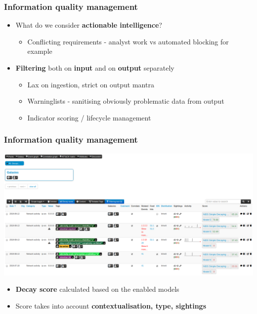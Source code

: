 \begin{frame}
\frametitle{Information quality management}
    \begin{itemize}
        \item What do we consider {\bf actionable intelligence}?
        \begin{itemize}
            \item Conflicting requirements - analyst work vs automated blocking for example
        \end{itemize}
        \item {\bf Filtering} both on {\bf input} and on {\bf output} separately
        \begin{itemize}
            \item Lax on ingestion, strict on output mantra
            \item Warninglists - sanitising obviously problematic data from output
            \item Indicator scoring / lifecycle management
        \end{itemize}
    \end{itemize}
\end{frame}

\begin{frame}
    \frametitle{Information quality management}
    \includegraphics[width=1.00\linewidth]{decaying-event.png}
    \begin{itemize}
        \item {\bf Decay score} calculated based on the enabled models
        \item Score takes into account {\bf contextualisation, type, sightings}
    \end{itemize}
\end{frame}

